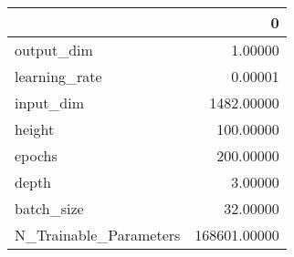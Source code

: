 \begin{tabular}{lr}
\toprule
{} &             0 \\
\midrule
output\_dim             &       1.00000 \\
learning\_rate          &       0.00001 \\
input\_dim              &    1482.00000 \\
height                 &     100.00000 \\
epochs                 &     200.00000 \\
depth                  &       3.00000 \\
batch\_size             &      32.00000 \\
N\_Trainable\_Parameters &  168601.00000 \\
\bottomrule
\end{tabular}

